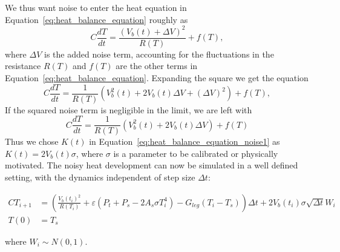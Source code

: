 We thus want noise to enter the heat equation in Equation~\eqref{eq:heat_balance_equation}
roughly as
\begin{equation}
  \label{eq:heat_balance_equation_noise}
  C\frac{dT}{dt}=\frac{(V_b(t) + \Delta V)^2}{R(T)}+ f(T),
\end{equation}
where $\Delta V$ is the added noise term, accounting for the
fluctuations in the resistance $R(T)$ and $f(T)$ are the other terms
in Equation~\eqref{eq:heat_balance_equation}.
Expanding the square we get the equation
\begin{equation}
  \label{eq:heat_balance_equation_noise_SDE1}
  C\frac{dT}{dt}=\frac{1}{R(T)} (V_b^2(t) + 2 V_b(t) \Delta V + (\Delta V)^2) + f(T),
\end{equation}
If the squared noise term is negligible in the limit, we are left with
\begin{equation}
  \label{eq:heat_balance_equation_noise_SDE2}
  C\frac{dT}{dt}=\frac{1}{R(T)} (V_b^2(t) + 2 V_b(t) \Delta V  ) + f(T)
\end{equation}
Thus we chose $K(t)$ in Equation~\eqref{eq:heat_balance_equation_noise1}
as $K(t) = 2 V_b(t) \sigma$, where $\sigma$ is a parameter to be calibrated or
physically motivated. The noisy heat development can now be simulated
in a well defined setting, with the dynamics independent of step size $\Delta t$:

\begin{align} \label{eq:heat_balance_equation_noise_discr}
 CT_{i+1}&=\left(\frac{V_b(t_{i})^2}{R(T_{i})}+\varepsilon(P_t+P_s -2A_s \sigma T_i^4)-G_{leg}(T_i-T_s)\right)\Delta t + 2 V_b(t_i) \sigma \sqrt{\Delta t} W_i \\
 T(0)&=T_s	\nonumber
\end{align}

where $W_i \sim N(0,1)$.


